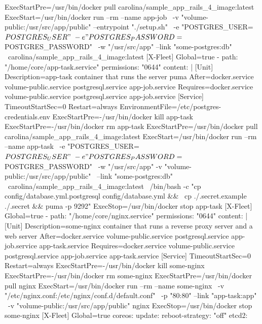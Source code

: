 \begin{codelisting}
\begin{code}
      ExecStartPre=/usr/bin/docker pull carolina/sample_app_rails_4_image:latest 
      ExecStart=/usr/bin/docker run --rm --name app-job \
      -v "volume-public:/usr/src/app/public" --entrypoint "./setup.sh" \
      -e "POSTGRES_USER=${POSTGRES_USER}" \
      -e "POSTGRES_PASSWORD=${POSTGRES_PASSWORD}" \
      -w "/usr/src/app" --link "some-postgres:db" \
      carolina/sample_app_rails_4_image:latest
      [X-Fleet]
      Global=true
  - path: "/home/core/app-task.service"
    permissions: "0644"
    content: |
      [Unit] 
      Description=app-task container that runs the server puma
      After=docker.service volume-public.service postgresql.service 
            app-job.service
      Requires=docker.service volume-public.service postgresql.service 
               app-job.service
      [Service] 
      TimeoutStartSec=0
      Restart=always 
      EnvironmentFile=/etc/postgres-credentials.env
      ExecStartPre=-/usr/bin/docker kill app-task 
      ExecStartPre=-/usr/bin/docker rm app-task
      ExecStartPre=/usr/bin/docker pull carolina/sample_app_rails_4_image:latest 
      ExecStart=/usr/bin/docker run --rm --name app-task \
      -e "POSTGRES_USER=${POSTGRES_USER}" \
      -e "POSTGRES_PASSWORD=${POSTGRES_PASSWORD}" \
      -w "/usr/src/app" -v "volume-public:/usr/src/app/public" \
      --link "some-postgres:db" \
      carolina/sample_app_rails_4_image:latest \
      /bin/bash -c "cp config/database.yml.postgresql config/database.yml && \
      cp ./.secret.example ./.secret && puma -p 9292"
      ExecStop=/usr/bin/docker stop app-task
      [X-Fleet]
      Global=true
  - path: "/home/core/nginx.service"
    permissions: "0644"
    content: |
      [Unit] 
      Description=some-nginx container that runs a reverse proxy server and a 
                  web server
      After=docker.service volume-public.service postgresql.service 
            app-job.service app-task.service
      Requires=docker.service volume-public.service postgresql.service 
               app-job.service app-task.service
      [Service] 
      TimeoutStartSec=0
      Restart=always 
      ExecStartPre=-/usr/bin/docker kill some-nginx 
      ExecStartPre=-/usr/bin/docker rm some-nginx
      ExecStartPre=/usr/bin/docker pull nginx 
      ExecStart=/usr/bin/docker run --rm --name some-nginx \
      -v "/etc/nginx.conf:/etc/nginx/conf.d/default.conf" \
      -p "80:80" --link "app-task:app" \
      -v "volume-public:/usr/src/app/public" nginx 
      ExecStop=/usr/bin/docker stop some-nginx
      [X-Fleet]
      Global=true
coreos:
  update:
    reboot-strategy: "off"
  etcd2:

\end{code}
\end{codelisting}
